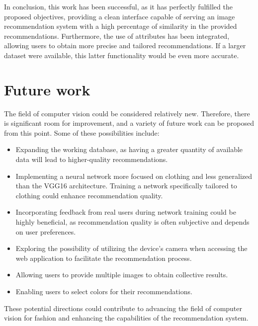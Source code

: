 \documentclass[12pt]{report} %
\begin{document}
In conclusion, this work has been successful, as it has perfectly fulfilled the proposed objectives, providing a clean interface capable of serving an image recommendation system with a high percentage of similarity in the provided recommendations. Furthermore, the use of attributes has been integrated, allowing users to obtain more precise and tailored recommendations. If a larger dataset were available, this latter functionality would be even more accurate.

\section*{Future work}
The field of computer vision could be considered relatively new. Therefore, there is significant room for improvement, and a variety of future work can be proposed from this point. Some of these possibilities include:
\begin{itemize}
	\item Expanding the working database, as having a greater quantity of available data will lead to higher-quality recommendations.
	\item Implementing a neural network more focused on clothing and less generalized than the VGG16 architecture. Training a network specifically tailored to clothing could enhance recommendation quality.
	\item Incorporating feedback from real users during network training could be highly beneficial, as recommendation quality is often subjective and depends on user preferences.
	\item Exploring the possibility of utilizing the device's camera when accessing the web application to facilitate the recommendation process.
	\item Allowing users to provide multiple images to obtain collective results.
	\item Enabling users to select colors for their recommendations.
\end{itemize}

These potential directions could contribute to advancing the field of computer vision for fashion and enhancing the capabilities of the recommendation system.
\end{document}
